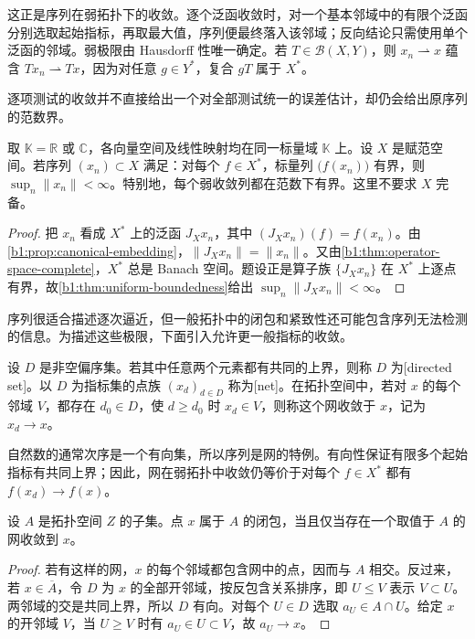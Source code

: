 这正是序列在弱拓扑下的收敛。逐个泛函收敛时，对一个基本邻域中的有限个泛函分别选取起始指标，再取最大值，序列便最终落入该邻域；反向结论只需使用单个泛函的邻域。弱极限由 Hausdorff 性唯一确定。若 \(T\in\mathcal B(X,Y)\)，则 \(x_n\rightharpoonup x\) 蕴含 \(Tx_n\rightharpoonup Tx\)，因为对任意 \(g\in Y^*\)，复合 \(gT\) 属于 \(X^*\)。

\ProseParagraphBreak

逐项测试的收敛并不直接给出一个对全部测试统一的误差估计，却仍会给出原序列的范数界。

\begin{proposition}\label{b1:prop:weak-sequence-bounded}
取 \(\mathbb K=\mathbb R\) 或 \(\mathbb C\)，各向量空间及线性映射均在同一标量域 \(\mathbb K\) 上。设 \(X\) 是赋范空间。若序列 \((x_n)\subset X\) 满足：对每个 \(f\in X^*\)，标量列 \(\bigl(f(x_n)\bigr)\) 有界，则 \(\sup_n\|x_n\|<\infty\)。特别地，每个弱收敛列都在范数下有界。这里不要求 \(X\) 完备。
\end{proposition}
\begin{proof}
把 \(x_n\) 看成 \(X^*\) 上的泛函 \(J_Xx_n\)，其中 \((J_Xx_n)(f)=f(x_n)\)。由\cref{b1:prop:canonical-embedding}，\(\|J_Xx_n\|=\|x_n\|\)。又由\cref{b1:thm:operator-space-complete}，\(X^*\) 总是 Banach 空间。题设正是算子族 \(\{J_Xx_n\}\) 在 \(X^*\) 上逐点有界，故\cref{b1:thm:uniform-boundedness}给出 \(\sup_n\|J_Xx_n\|<\infty\)。
\end{proof}

序列很适合描述逐次逼近，但一般拓扑中的闭包和紧致性还可能包含序列无法检测的信息。为描述这些极限，下面引入允许更一般指标的收敛。

\begin{definition}\label{b1:def:net}
设 \(D\) 是非空偏序集。若其中任意两个元素都有共同的上界，则称 \(D\) 为[directed set]。以 \(D\) 为指标集的点族 \((x_d)_{d\in D}\) 称为[net]。在拓扑空间中，若对 \(x\) 的每个邻域 \(V\)，都存在 \(d_0\in D\)，使 \(d\geq d_0\) 时 \(x_d\in V\)，则称这个网收敛于 \(x\)，记为 \(x_d\to x\)。
\end{definition}

自然数的通常次序是一个有向集，所以序列是网的特例。有向性保证有限多个起始指标有共同上界；因此，网在弱拓扑中收敛仍等价于对每个 \(f\in X^*\) 都有 \(f(x_d)\to f(x)\)。

\begin{proposition}\label{b1:prop:net-closure}
设 \(A\) 是拓扑空间 \(Z\) 的子集。点 \(x\) 属于 \(A\) 的闭包，当且仅当存在一个取值于 \(A\) 的网收敛到 \(x\)。
\end{proposition}
\begin{proof}
若有这样的网，\(x\) 的每个邻域都包含网中的点，因而与 \(A\) 相交。反过来，若 \(x\in\overline A\)，令 \(D\) 为 \(x\) 的全部开邻域，按反包含关系排序，即 \(U\leq V\) 表示 \(V\subset U\)。两邻域的交是共同上界，所以 \(D\) 有向。对每个 \(U\in D\) 选取 \(a_U\in A\cap U\)。给定 \(x\) 的开邻域 \(V\)，当 \(U\geq V\) 时有 \(a_U\in U\subset V\)，故 \(a_U\to x\)。
\end{proof}

